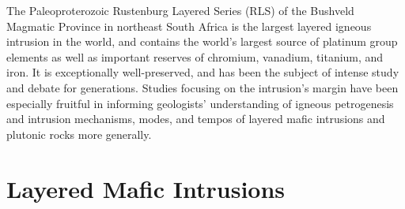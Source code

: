 %

The Paleoproterozoic Rustenburg Layered Series (RLS) of the Bushveld
Magmatic Province in northeast South Africa is the largest layered
igneous intrusion in the world, and contains the world's largest source
of platinum group elements as well as important reserves of chromium,
vanadium, titanium, and iron. It is exceptionally well-preserved, and
has been the subject of intense study and debate for generations.
Studies focusing on the intrusion's margin have been especially fruitful
in informing geologists' understanding of igneous petrogenesis and
intrusion mechanisms, modes, and tempos of layered mafic intrusions and
plutonic rocks more generally. 

\section{Layered Mafic Intrusions}
\label{sec:ch5-layered-mafic-intrusions}

